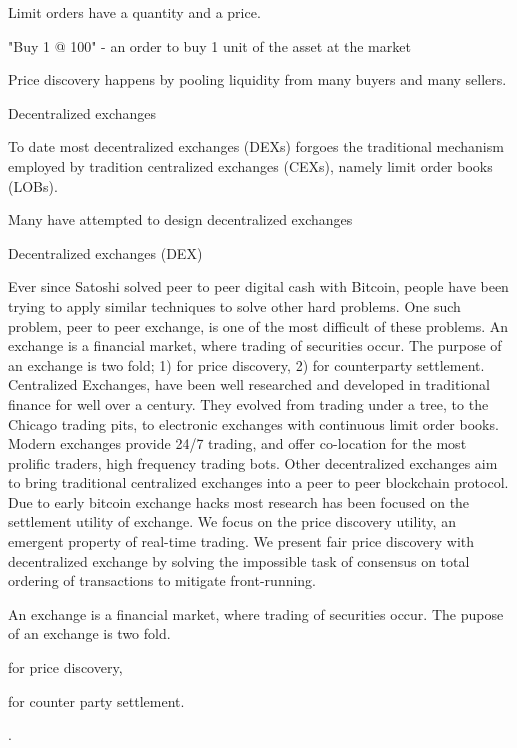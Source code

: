 \documentclass[12pt]{article}
\begin{document}
Limit orders have a quantity and a price. 

\begin{enumerate*}
    \item "Buy 1 @ 100" - an order to buy 1 unit of the asset at the market  
\end{enumerate*}



Price discovery happens by pooling liquidity from many buyers and many sellers. 

Decentralized exchanges 


To date most decentralized exchanges (DEXs) forgoes the traditional mechanism employed by tradition centralized exchanges (CEXs), namely limit order books (LOBs).  

Many have attempted to design decentralized exchanges 




Decentralized exchanges (DEX) 




    Ever  since  Satoshi  solved  peer  to  peer  digital  cash  with  Bitcoin,  people have  been  trying  to  apply  similar  techniques  to  solve  other  hard  problems. One such problem, peer to peer exchange, is one of the most difficult of these problems. An exchange is a financial market, where trading of securities occur. The purpose of an exchange is two fold;  1) for price discovery, 2) for counterparty settlement. Centralized Exchanges, have been well researched and developed in traditional finance for well over a century.  They evolved from trading under a tree, to the Chicago trading pits, to electronic exchanges with continuous limit order books. Modern exchanges provide 24/7 trading, and offer co-location for the most prolific traders, high frequency trading bots. Other decentralized exchanges aim to bring traditional centralized exchanges into a peer to peer blockchain protocol. Due to early bitcoin exchange hacks most research has been focused on the settlement utility of exchange. We focus on the price discovery utility, an emergent property of real-time trading. We present fair price discovery with decentralized exchange by solving the impossible task of consensus on total ordering of transactions to mitigate front-running.



   

An exchange is a financial market, where trading of securities occur. The pupose of an exchange is two fold. \begin {enumerate*} [1) ]%
\item for price discovery, \item for counter party settlement. \end {enumerate*}. 
\end{document}
